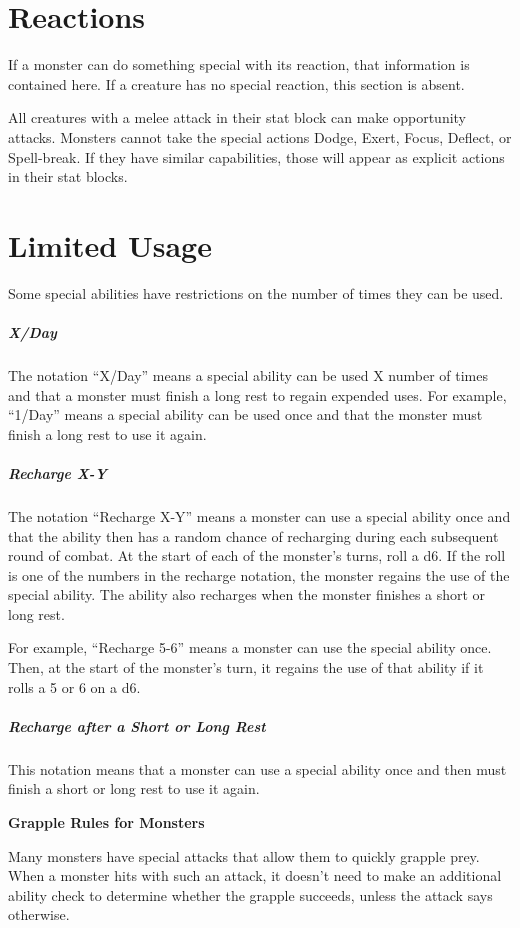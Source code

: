 \section{Reactions}

If a monster can do something special with its reaction, that information is contained here. If a creature has no special reaction, this section is absent.

All creatures with a melee attack in their stat block can make opportunity attacks. Monsters cannot take the special actions Dodge, Exert, Focus, Deflect, or Spell-break. If they have similar capabilities, those will appear as explicit actions in their stat blocks. 

\section{Limited Usage}

Some special abilities have restrictions on the number of times they can be used.

\subparagraph*{X/Day} The notation “X/Day” means a special ability can be used X number of times and that a monster must finish a long rest to regain expended uses. For example, “1/Day” means a special ability can be used once and that the monster must finish a long rest to use it again.

\subparagraph*{Recharge X-Y} The notation “Recharge X-Y” means a monster can use a special ability once and that the ability then has a random chance of recharging during each subsequent round of combat. At the start of each of the monster's turns, roll a d6. If the roll is one of the numbers in the recharge notation, the monster regains the use of the special ability. The ability also recharges when the monster finishes a short or long rest.

For example, “Recharge 5-6” means a monster can use the special ability once. Then, at the start of the monster's turn, it regains the use of that ability if it rolls a 5 or 6 on a d6.

\subparagraph*{Recharge after a Short or Long Rest} This notation means that a monster can use a special ability once and then must finish a short or long rest to use it again.

\textbf*{Grapple Rules for Monsters}

Many monsters have special attacks that allow them to quickly grapple prey. When a monster hits with such an attack, it doesn't need to make an additional ability check to determine whether the grapple succeeds, unless the attack says otherwise.

